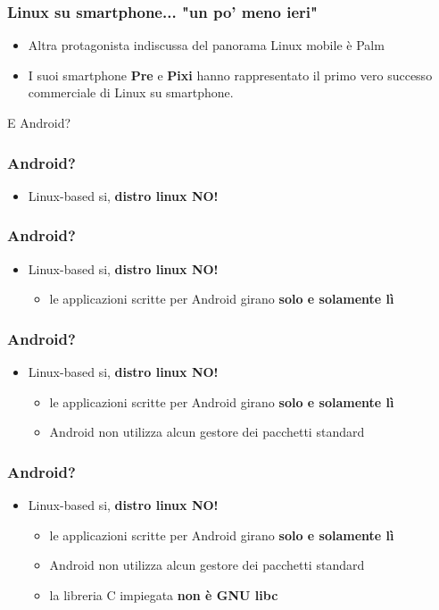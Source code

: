 \documentclass[12pt]{beamer}
\begin{document}
\begin{frame}
\frametitle{Linux su smartphone... "un po' meno ieri"}
\begin{itemize}
\item Altra protagonista indiscussa del panorama Linux mobile è Palm
\item I suoi smartphone \textbf{Pre} e \textbf{Pixi} hanno rappresentato il primo vero successo commerciale di Linux su smartphone.
\end{itemize}
E Android?
\end{frame}

\begin{frame}
\frametitle{Android?}
\begin{itemize}
\item Linux-based si, \textbf{distro linux NO!}
\end{itemize}
\end{frame}

\begin{frame}
\frametitle{Android?}
\begin{itemize}
\item Linux-based si, \textbf{distro linux NO!}
\begin{itemize}
\item le applicazioni scritte per Android girano \textbf{solo e solamente lì}
\end{itemize}
\end{itemize}
\end{frame}

\begin{frame}
\frametitle{Android?}
\begin{itemize}
\item Linux-based si, \textbf{distro linux NO!}
\begin{itemize}
\item le applicazioni scritte per Android girano \textbf{solo e solamente lì}
\item Android non utilizza alcun gestore dei pacchetti standard
\end{itemize}
\end{itemize}
\end{frame}

\begin{frame}
\frametitle{Android?}
\begin{itemize}
\item Linux-based si, \textbf{distro linux NO!}
\begin{itemize}
\item le applicazioni scritte per Android girano \textbf{solo e solamente lì}
\item Android non utilizza alcun gestore dei pacchetti standard
\item la libreria C impiegata \textbf{non è GNU libc}
\end{itemize}
\end{itemize}
\end{frame}
\end{document}
